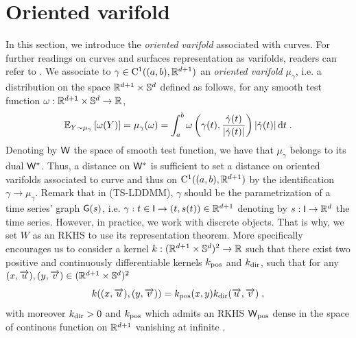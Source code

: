 \section{Oriented varifold}

\label{appendix:varifold}
In this section, we introduce the \textit{oriented varifold} associated with curves.
For further readings on curves and surfaces representation as varifolds, readers can refer to \cite{kaltenmark2017general,charon2013varifold}. 
We associate to $\gamma\in \mathrm{C}^1((a,b),\mathbb{R}^{d+1})$ an \textit{oriented varifold} $\mu_\gamma$, i.e. a distribution on the space $\mathbb{R}^{d+1}\times \mathbb{S}^{d}$ defined as follows, for any smooth test function $\omega :\mathbb{R}^{d+1}\times \mathbb{S}^{d}\to \mathbb{R}  $,
\begin{equation}
  \mathbb{E}_{Y\sim \mu_\gamma}\left[\omega(Y)\right]=\mu_\gamma(\omega)=\int_a^b \omega\left(\gamma(t),\frac{\dot{\gamma}(t)}{|\dot{\gamma}(t)|}\right)|\dot{\gamma}(t)|\mathop{}\!\mathrm{d} t \; .
\end{equation}
Denoting by $\mathsf{W}$ the space of smooth test function, we have that $\mu_\gamma $ belongs to its dual $\mathsf{W}^*$.
 Thus, a distance on $\mathsf{W}^*$ is sufficient to set a distance on oriented varifolds associated to curve and thus on $\mathrm{C}^1((a,b),\mathbb{R}^{d+1})$ by the identification $\gamma\to \mu_\gamma $.
Remark that in (TS-LDDMM), $\gamma$ should be the parametrization of a time series' graph $\mathsf{G}(s)$, i.e. $\gamma: t\in \mathsf{I} \to (t,s(t))\in\mathbb{R}^{d+1} $ denoting by $s:\mathsf{I} \to \mathbb{R}^d$ the time series.
However, in practice, we work with discrete objects.
 That is why, we set $W$ as an RKHS to use its representation theorem.
 More specifically \citep[Proposition 2 \& 4]{kaltenmark2017general} encourages us to consider a kernel $k:(\mathbb{R}^{d+1} \times \mathbb{S}^d)^2\to \mathbb{R}$ such that there exist two positive and continuously differentiable kernels $k_{\mathrm{pos}}$ and $k_{\mathrm{dir}}$, 
 such that for any $(x,\overrightarrow{u}),(y,\overrightarrow{v}) \in (\mathbb{R}^{d+1} \times \mathbb{S}^d)^2$
 \begin{equation}
     k((x,\overrightarrow{u}),(y,\overrightarrow{v})) = k_{\mathrm{pos}}(x,y)k_{\mathrm{dir}}(\overrightarrow{u},\overrightarrow{v}) \;,
   \end{equation}
 with moreover $k_{\mathrm{dir}}>0$ and $ k_{\mathrm{pos}}$ which admits an RKHS $\mathsf{W}_{\mathrm{pos}}$ dense in the space of continous function on $\mathbb{R}^{d+1}$ vanishing at infinite \cite{carmeli2010vector}.


